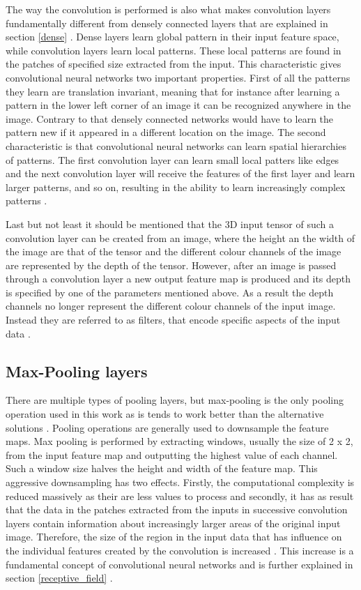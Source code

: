 The way the convolution is performed is also what makes convolution layers fundamentally different from densely connected layers that are explained in section \ref{dense} . Dense layers learn global pattern in their input feature space, while convolution layers learn local patterns. These local patterns are found in the patches of specified size extracted from the input. This characteristic gives convolutional neural networks two important properties. First of all the patterns they learn are translation invariant, meaning that for instance after learning a pattern in the lower left corner of an image it can be recognized anywhere in the image. Contrary to that densely connected networks would have to learn the pattern new if it appeared in a different location on the image. The second characteristic is that convolutional neural networks can learn spatial hierarchies of patterns. The first convolution layer can learn small local patters like edges and the next convolution layer will receive the features of the first layer and learn larger patterns, and so on, resulting in the ability to learn increasingly complex patterns \cite[Chapter~5]{cnn}.

Last but not least it should be mentioned that the 3D input tensor of such a convolution layer can be created from an image, where the height an the width of the image are that of the tensor and the different colour channels of the image are represented by the depth of the tensor. However, after an image is passed through a convolution layer a new output feature map is produced and its depth is specified by one of the parameters mentioned above. As a result the depth channels no longer represent the different colour channels of the input image. Instead they are referred to as filters, that encode specific aspects of the input data \cite[Chapter~5]{cnn}. 

\subsection{Max-Pooling layers} 
\label{max_pooling}
There are multiple types of pooling layers, but max-pooling is the only pooling operation used in this work as is tends to work better than the alternative solutions \cite[Chapter~5]{cnn}. Pooling operations are generally used to downsample the feature maps. Max pooling is performed by extracting windows, usually the size of 2 x 2, from the input feature map and outputting the highest value of each channel. Such a window size halves the height and width of the feature map. This aggressive downsampling has two effects. Firstly, the computational complexity is reduced massively as their are less values to process and secondly, it has as result that the data in the patches extracted from the inputs in successive convolution layers contain information about increasingly larger areas of the original input image. Therefore, the size of the region in the input data that has influence on the individual features created by the convolution is increased \cite[Chapter~5]{cnn}. This increase is a fundamental concept of convolutional neural networks and is further explained in section \ref{receptive_field} .


